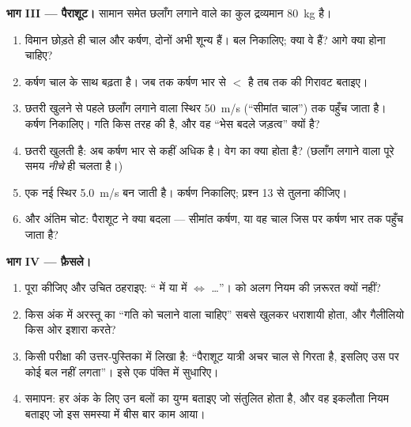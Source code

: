 \begin{problem}
\medskip
\noindent\textbf{भाग III --- पैराशूट।}
सामान समेत छलाँग लगाने वाले का कुल द्रव्यमान \qty{80}{kg} है।
\begin{enumerate}[resume]
  \item विमान छोड़ते ही  चाल और कर्षण, दोनों अभी शून्य हैं।
        बल निकालिए; क्या वे  हैं? आगे क्या
        होना चाहिए?
  \item कर्षण चाल के साथ बढ़ता है। जब तक कर्षण भार से $<$ है
        तब तक की गिरावट बताइए।
  \item छतरी खुलने से पहले छलाँग लगाने वाला स्थिर \qty{50}{m/s} (``सीमांत
        चाल'') तक पहुँच जाता है। कर्षण निकालिए। गति किस तरह की है, और वह
        ``भेस बदले जड़त्व'' क्यों है?
  \item छतरी खुलती है: अब कर्षण भार से कहीं अधिक है। वेग का
        क्या होता है? (छलाँग लगाने वाला पूरे समय \emph{नीचे} ही चलता
        है।)
  \item एक नई स्थिर \qty{5.0}{m/s} बन जाती है। कर्षण निकालिए; प्रश्न 13 से
        तुलना कीजिए।
  \item और अंतिम चोट: पैराशूट ने क्या बदला --- सीमांत कर्षण, या वह चाल
        जिस पर कर्षण भार तक पहुँच जाता है?
\end{enumerate}

\medskip
\noindent\textbf{भाग IV --- फ़ैसले।}
\begin{enumerate}[resume]
  \item पूरा कीजिए और उचित ठहराइए: `` में या  में $\iff$ \dots''।  को अलग नियम की ज़रूरत
        क्यों नहीं?
  \item किस अंक में अरस्तू का ``गति को चलाने वाला चाहिए'' सबसे खुलकर
        धराशायी होता, और गैलीलियो किस ओर इशारा करते?
  \item किसी परीक्षा की उत्तर-पुस्तिका में लिखा है: ``पैराशूट यात्री अचर
        चाल से गिरता है, इसलिए उस पर कोई बल नहीं लगता''। इसे एक
        पंक्ति में सुधारिए।
  \item समापन: हर अंक के लिए उन बलों का युग्म बताइए जो
        संतुलित होता है, और वह इकलौता नियम बताइए जो इस समस्या
        में बीस बार काम आया।
\end{enumerate}
\end{problem}
